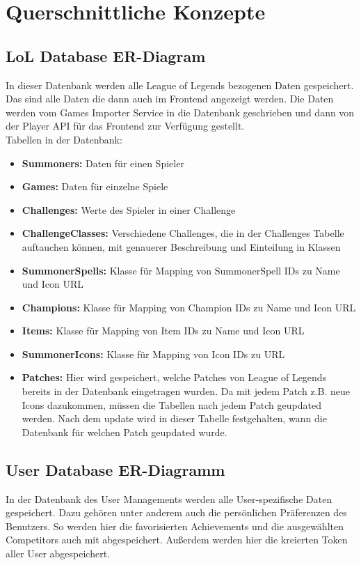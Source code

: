 \section{Querschnittliche Konzepte}

\subsection{LoL Database ER-Diagram}
In dieser Datenbank werden alle League of Legends bezogenen Daten gespeichert. Das sind alle Daten die dann auch im Frontend angezeigt werden. Die Daten werden vom Games Importer Service in die Datenbank geschrieben und dann von der Player API für das Frontend zur Verfügung gestellt.\\
Tabellen in der Datenbank:\\
\begin{itemize}
\item \textbf{Summoners:} Daten für einen Spieler
\item \textbf{Games:} Daten für einzelne Spiele
\item \textbf{Challenges:} Werte des Spieler in einer Challenge
\item \textbf{ChallengeClasses:} Verschiedene Challenges, die in der Challenges Tabelle auftauchen können, mit genauerer Beschreibung und Einteilung in Klassen
\item \textbf{SummonerSpells:} Klasse für Mapping von SummonerSpell IDs zu Name und Icon URL
\item \textbf{Champions:} Klasse für Mapping von Champion IDs zu Name und Icon URL
\item \textbf{Items:} Klasse für Mapping von Item IDs zu Name und Icon URL
\item \textbf{SummonerIcons:} Klasse für Mapping von Icon IDs zu URL
\item \textbf{Patches:} Hier wird gespeichert, welche Patches von League of Legends bereits in der Datenbank eingetragen wurden. Da mit jedem Patch z.B. neue Icons dazukommen, müssen die Tabellen nach jedem Patch geupdated werden. Nach dem update wird in dieser Tabelle festgehalten, wann die Datenbank für welchen Patch geupdated wurde.
\end{itemize}

\subsection{User Database ER-Diagramm}
In der Datenbank des User Managements werden alle User-spezifische Daten gespeichert. Dazu gehören unter anderem auch die persönlichen Präferenzen des Benutzers. 
So werden hier die favorisierten Achievements und die ausgewählten Competitors auch mit abgespeichert. Außerdem werden hier die kreierten Token aller User abgespeichert.   

